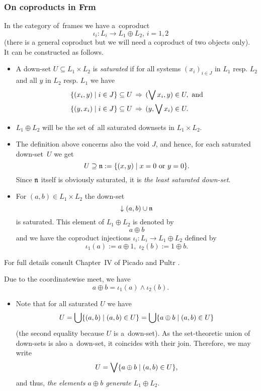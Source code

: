 \subsubsection*{On coproducts in Frm}

In the category of~frames we have a~coproduct
\[
  \iota_i: L_i \to L_1 \oplus L_2, \, i = 1, 2
\]
(there is a general coproduct but we will need a coproduct of two objects
 only).
It can be constructed as follows.

\begin{itemize}
\item A down-set $U\subseteq L_1 \times L_2$ is \emph{saturated\/} if for all
systems $(x_i)_{i\in J}$ in $L_1$ resp. $L_2$ and all $y$ in $L_2$ resp. $L_1$
we have \label{df:satur}
  \begin{align*}
    \{ (x_i, y) \mid i\in J \} \subseteq U \, &\Rightarrow \, (\bigvee x_i, y)\in U,
    \text{ and} \\
    \{ (y, x_i) \mid i\in J \} \subseteq U \, &\Rightarrow \, (y, \bigvee x_i)\in U.
  \end{align*}

\item $L_1 \oplus L_2$ will be the set of~all saturated downsets in $L_1
\times L_2$.

\item The definition above concerns also the void $J$, and hence, for each
saturated down-set~$U$ we get
\[
  U\supseteq \mathfrak{n} := \{ (x, y) \mid x = 0 \text{ or } y = 0 \}.
\]
Since $\mathfrak{n}$ itself is obviously saturated, it is \emph{the least saturated
down-set\/}.

\item For $(a, b)\in L_1 \times L_2$ the down-set
\[
  \left\downarrow\right. (a, b) \cup \mathfrak{n}
\]
is saturated.
This element of $L_1 \oplus L_2$ is denoted by
\[
  a \oplus b
\]
and we have the coproduct injections $\iota_i: L_i \to L_1 \oplus L_2$ defined
by
\[
  \iota_1(a) := a \oplus 1, \; \iota_2(b) := 1 \oplus b.
\]

\end{itemize}

For full details consult Chapter~IV of Picado and Pultr \cite{picado-pultr12}.

\begin{cor*}
  Due to the coordinatewise meet, we have
  \[
    a \oplus b = \iota_1(a) \wedge \iota_2(b).
  \]
\end{cor*}

\begin{itemize}
\item Note that for all saturated $U$ we have
\[
  U
  = \bigcup \{ (a, b) \mid (a, b)\in U \}
  = \bigcup \{ a \oplus b \mid (a, b)\in U \}
\]
(the second equality because $U$ is a~down-set).
As the set-theoretic union of down-sets is also a~down-set, it coincides with
their join.
Therefore, we may write 
\[
  U = \bigvee \{ a \oplus b \mid (a, b)\in U \},
\]
and thus, \emph{the elements $a \oplus b$ generate $L_1 \oplus L_2$\/}.
\end{itemize}

